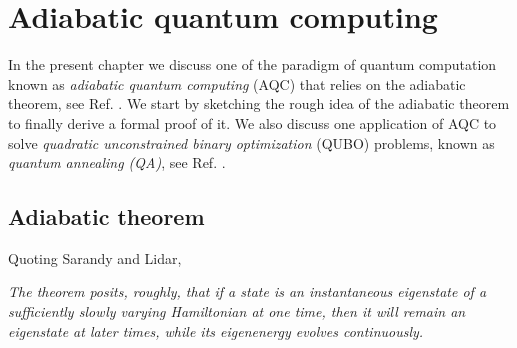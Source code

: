 
\chapter{Adiabatic quantum computing} %

\label{Chapter1} %
In the present chapter we discuss one of the paradigm of quantum computation known as \textit{adiabatic quantum computing} (AQC) that relies on the adiabatic theorem, see Ref. \cite{Farhi2000QuantumEvolution}. We start by sketching the rough idea of the adiabatic theorem to finally derive a formal proof of it. We also discuss one application of AQC to solve \textit{quadratic unconstrained binary optimization} (QUBO) problems, known as \textit{quantum annealing (QA)}, see Ref. \cite{Kadowaki1998QuantumModel}.
\section{Adiabatic theorem}
Quoting Sarandy and Lidar,
\begin{displayquote}
\textit{The theorem posits, roughly, that if a state is an instantaneous eigenstate of a sufficiently slowly varying Hamiltonian at one time, then it will remain an eigenstate at later times, while its eigenenergy evolves continuously.}
\end{displayquote}
